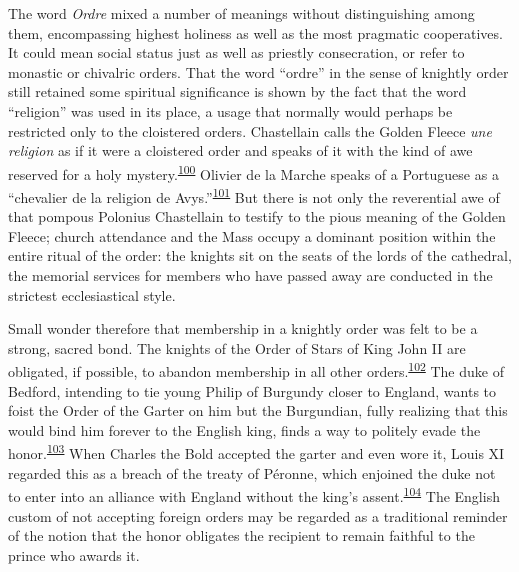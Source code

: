 The word \emph{Ordre} mixed a number of meanings without distinguishing
among them, encompassing highest holiness as well as the most pragmatic
cooperatives. It could mean social status just as well as priestly
consecration, or refer to monastic or chivalric orders. That the word
``ordre'' in the sense of knightly order still retained some spiritual
significance is shown by the fact that the word ``religion'' was used in
its place, a usage that normally would perhaps be restricted only to the
cloistered orders. Chastellain calls the Golden Fleece \emph{une
religion} as if it were a cloistered order and speaks of it with the
kind of awe reserved for a holy
mystery.\textsuperscript{\protect\hypertarget{10_Chapter_Three__THE_HEROIC_DREAM.xhtmlux5cux23id_1735}{\protect\hyperlink{23_NOTES.xhtmlux5cux23id_1736}{100}}}
Olivier de la Marche speaks of a Portuguese as a ``chevalier de la
religion de
Avys.''\textsuperscript{\protect\hypertarget{10_Chapter_Three__THE_HEROIC_DREAM.xhtmlux5cux23id_1733}{\protect\hyperlink{23_NOTES.xhtmlux5cux23id_1734}{101}}}
But there is not only the reverential awe of that pompous Polonius
Chastellain to testify to the pious meaning of the Golden Fleece; church
attendance and the Mass occupy a dominant position within the entire
ritual of the order: the knights sit on the seats of the lords of the
cathedral, the memorial services for members who have passed away are
conducted in the strictest ecclesiastical style.

Small wonder therefore that membership in a knightly order was felt to
be a strong, sacred bond. The knights of the Order of Stars of King John
II are obligated, if possible, to abandon membership in all other
orders.\textsuperscript{\protect\hypertarget{10_Chapter_Three__THE_HEROIC_DREAM.xhtmlux5cux23id_1731}{\protect\hyperlink{23_NOTES.xhtmlux5cux23id_1732}{102}}}
The duke of Bedford, intending to tie young Philip of Burgundy closer to
England, wants to foist the Order of the Garter on him but the
Burgundian, fully realizing that this would bind him forever to the
English king, finds a way to politely evade the
honor.\textsuperscript{\protect\hypertarget{10_Chapter_Three__THE_HEROIC_DREAM.xhtmlux5cux23id_1729}{\protect\hyperlink{23_NOTES.xhtmlux5cux23id_1730}{103}}}
When Charles the Bold accepted the garter and even wore it, Louis XI
regarded this as a breach of the treaty of Péronne, which enjoined the
duke not to enter into an alliance with England without the king's
assent.\textsuperscript{\protect\hypertarget{10_Chapter_Three__THE_HEROIC_DREAM.xhtmlux5cux23id_1727}{\protect\hyperlink{23_NOTES.xhtmlux5cux23id_1728}{104}}}
The English custom of not accepting foreign orders may be regarded as a
traditional reminder of the notion that the honor obligates the
recipient to remain faithful to the prince who awards it.

